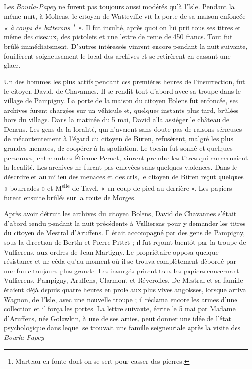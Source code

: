 \documentclass[french,twoside]{book} %
\begin{document}
\noindent Les \emph{Bourla-Papey} ne furent pas toujours aussi modérés qu’à l’Isle. Pendant la même nuit, à Moliens, le citoyen de Watteville vit la porte de sa maison enfoncée \emph{« à coups de batterans \footnote{Marteau en fonte dont on se sert pour casser des pierres.} »}. Il fut insulté, après quoi on lui prit tous ses titres et même des ciseaux, des pistolets et une lettre de rente de 450 francs. Tout fut brûlé immédiatement. D’autres intéressés vinrent encore pendant la nuit suivante, fouillèrent soigneusement le local des archives et se retirèrent en cassant une glace.\par
Un des hommes les plus actifs pendant ces premières heures de l’insurrection, fut le citoyen David, de Chavannes. Il se rendit tout d’abord avec sa troupe dans le village de Pampigny. La porte de la maison du citoyen Bolens fut enfoncée, ses archives furent chargées sur un véhicule et, quelques instants plus tard, brûlées hors du village. Dans la matinée du 5 mai, David alla assiéger le château de Denens. Les gens de la localité, qui n’avaient sans doute pas de raisons sérieuses de mécontentement à l’égard du citoyen de Büren, refusèrent, malgré les plus grandes menaces, de coopérer à la spoliation. Le tocsin fut sonné et quelques personnes, entre autres Étienne Pernet, vinrent prendre les titres qui concernaient la localité. Les archives ne furent pas enlevées sans quelques violences. Dans le désordre et au milieu des menaces et des cris, le citoyen de Büren reçut quelques « bourrades » et M\textsuperscript{elle} de Tavel, « un coup de pied au derrière ». Les papiers furent ensuite brûlés sur la route de Morges.\par
Après avoir détruit les archives du citoyen Bolens, David de Chavannes s’était d’abord rendu pendant la nuit précédente à Vullierens pour y demander les titres du citoyen de Mestral d’Aruffens. Il était accompagné par des gens de Pampigny, sous la direction de Berthi et Pierre Pittet ; il fut rejoint bientôt par la troupe de Vullierens, aux ordres de Jean Martigny. Le propriétaire opposa quelque résistance et ne céda qu’au moment où il se trouva complètement débordé par une foule toujours plus grande. Les insurgés prirent tous les papiers concernant Vullierens, Pampigny, Aruffens, Clarmont et Réverolles. De Mestral et sa famille étaient déjà depuis quatre heures en proie aux plus vives angoisses, lorsque arriva Wagnon, de l’Isle, avec une nouvelle troupe ; il réclama encore les armes d’une collection et il força les portes. La lettre suivante, écrite le 5 mai par Madame d’Aruffens, née Golowkin, à une de ses amies, peut donner une idée de l’état psychologique dans lequel se trouvait une famille seigneuriale après la visite des \emph{Bourla-Papey} :\par
\end{document}
